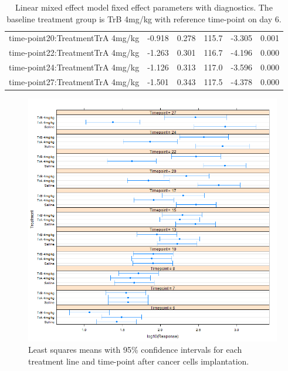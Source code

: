 \begin{table}
\begin{tabular}{lccccc}
		time-point20:TreatmentTrA 4mg/kg & -0.918      & 0.278     & 115.7 & -3.305  & 0.001   \\
		time-point22:TreatmentTrA 4mg/kg & -1.263      & 0.301     & 116.7 & -4.196  & 0.000   \\
		time-point24:TreatmentTrA 4mg/kg & -1.126      & 0.313     & 117.0 & -3.596  & 0.000   \\
		time-point27:TreatmentTrA 4mg/kg & -1.501      & 0.343     & 117.5 & -4.378  & 0.000   \\
		\hline
	\end{tabular}
	\caption{Linear mixed effect model fixed effect parameters with diagnostics.
	The baseline treatment group is TrB 4mg/kg with reference time-point on day 6.}
	\label{LME_factor_TrA_baseline_TrB}
\end{table}

\begin{figure}
	\centering
	\includegraphics[width=\textwidth]{xenograph/figures/effects_LME_factor1.png}
	\caption{Least squares means with 95\% confidence intervals for each treatment line and time-point after cancer cells implantation.}
	\label{effects_LME_factor}
\end{figure}

